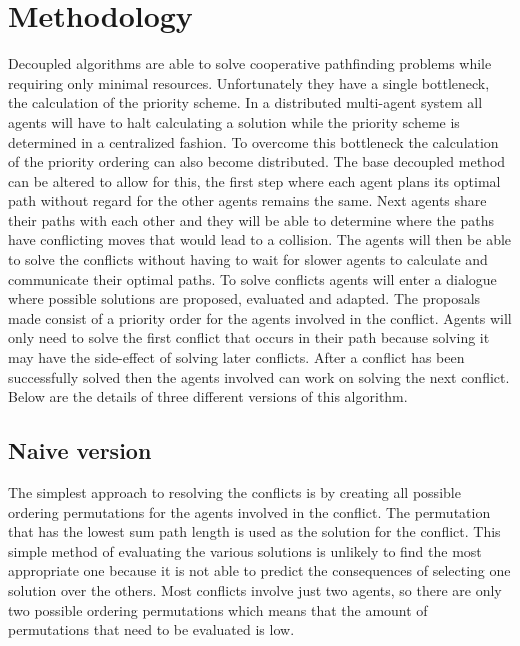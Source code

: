 \section{Methodology}\label{sec:method}
Decoupled algorithms are able to solve cooperative pathfinding problems while
requiring only minimal resources. Unfortunately they have a single bottleneck,
the calculation of the priority scheme. In a distributed multi-agent system all
agents will have to halt calculating a solution while the priority scheme is
determined in a centralized fashion. To overcome this bottleneck the
calculation of the
priority ordering can also become distributed. The base decoupled method can be
altered to allow for this, the first step where each agent plans its optimal
path without regard for the other agents remains the same. Next agents share
their paths with each other and they will be able to determine where the paths
have conflicting moves that would lead to a collision. The agents will then be
able to solve the conflicts without having to wait for slower agents to
calculate and communicate their optimal paths. To solve conflicts agents will
enter a dialogue where possible solutions are proposed, evaluated and adapted.
The proposals made consist of a priority order for the agents involved in the
conflict. Agents will only need to solve the first conflict that occurs in
their path because solving it may have the side-effect of solving later
conflicts. After a conflict has been successfully solved then the agents
involved can work on solving the next conflict.
Below are the details of three different versions of this algorithm.

\subsection{Naive version}
The simplest approach to resolving the conflicts is by creating all possible
ordering permutations for the agents involved in the conflict. The permutation
that has the lowest sum path length is used as the solution for the conflict.
This simple method of evaluating the various solutions is unlikely to find the
most appropriate one because it is not able to predict the consequences of
selecting one solution over the others.
Most conflicts involve just two agents, so there are only two possible ordering
permutations which means that the amount of permutations that need to be
evaluated is low.

